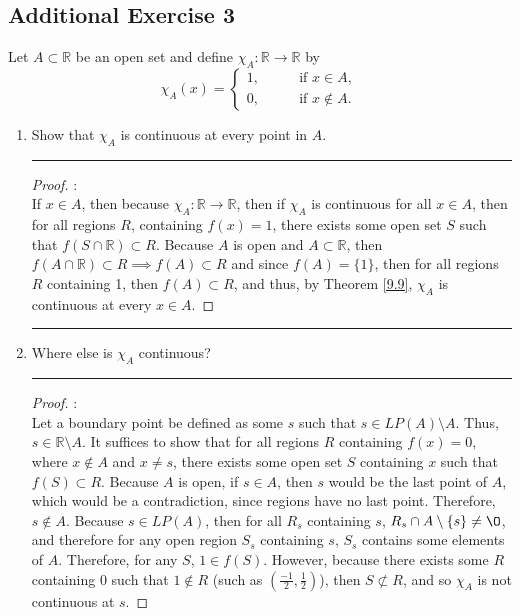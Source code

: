 \documentclass[openany, amssymb, psamsfonts]{amsart}
\newcommand{\bbR}{\mathbb{R}}
\renewcommand{\emptyset}{\O}
\newcommand{\sm}{\setminus}
\newcommand{\arr}{\longrightarrow}
\theoremstyle{definition}
\numberwithin{equation}{section}
\begin{document}
\subsection*{Additional Exercise 3}
Let $A \subset \bbR$ be an open set and define $\chi_A: \bbR \to \bbR$ by
\[
	\chi_A(x) =
		\begin{cases}
			1, \qquad &\text{if } x \in A,\\
			0, &\text{if } x \notin A.
		\end{cases}
\]
\begin{enumerate}
	\item Show that $\chi_A$ is continuous at every point in $A$.
\vspace{4pt}     \hrule   \vspace{4pt} \begin{proof}:\\
If $x\in A$, then because $\chi_A\colon \bbR \arr \bbR$, then if $\chi_A$ is continuous for all $x\in A$, then for all regions $R$, containing $f(x)=1$, there exists some open set $S$ such that $f(S\cap \bbR) \subset R$. Because $A$ is open and $A\subset \bbR$, then $f(A\cap \bbR) \subset R \implies f(A) \subset R$ and since $f(A) = \{1\}$, then for all regions $R$ containing 1, then $f(A)\subset R$, and thus, by Theorem \ref{9.9}, $\chi_A$ is continuous at every $x\in A$.
 \end{proof}\vspace{4pt}     \hrule   \vspace{4pt}
	\item Where else is $\chi_A$ continuous?
 \vspace{4pt}     \hrule   \vspace{4pt} \begin{proof}:\\
Let a boundary point be defined as some $s$ such that $s\in LP(A)\setminus A$. Thus, $s\in \bbR \setminus A$. It suffices to show that for all regions $R$ containing $f(x) = 0$, where $x\notin A$ and $x\neq s$, there exists some open set $S$ containing $x$ such that $f(S) \subset R$. Because $A$ is open, if $s\in A$, then $s$ would be the last point of $A$, which would be a contradiction, since regions have no last point. Therefore, $s\notin A$. Because $s\in LP(A)$, then for all $R_s$ containing $s$, $R_s\cap A\sm \{s\} \neq \emptyset$, and therefore for any open region $S_s$ containing $s$, $S_s$ contains some elements of $A$. Therefore, for any $S$, $1\in f(S)$. However, because there exists some $R$ containing $0$ such that $1\notin R$ (such as $(\frac{-1}{2}, \frac{1}{2})$), then $S\not\subset R$, and so $\chi_A$ is not continuous at $s$. 

\end{proof}
\end{enumerate}
\end{document}
